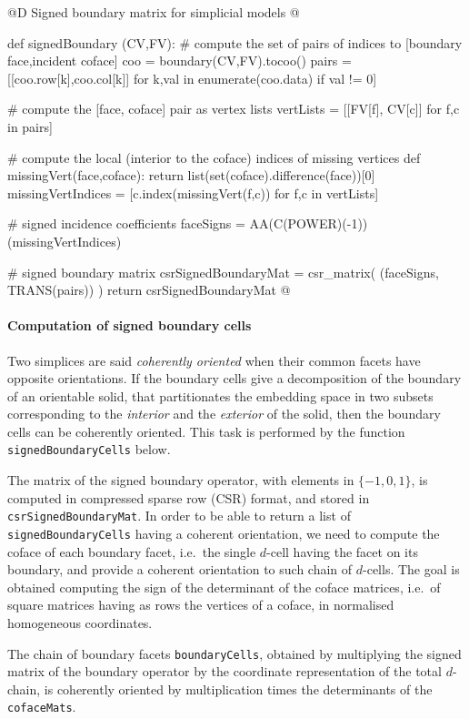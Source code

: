 \documentclass[11pt,oneside]{article}	%
\begin{document}
@D Signed boundary matrix for simplicial models
@{def signedBoundary (CV,FV):
	# compute the set of pairs of indices to [boundary face,incident coface]
	coo = boundary(CV,FV).tocoo()
	pairs = [[coo.row[k],coo.col[k]] for k,val in enumerate(coo.data) if val != 0]

	# compute the [face, coface] pair as vertex lists
	vertLists = [[FV[f], CV[c]] for f,c in pairs]

	# compute the local (interior to the coface) indices of missing vertices 
	def missingVert(face,coface): return list(set(coface).difference(face))[0]
	missingVertIndices = [c.index(missingVert(f,c)) for f,c in vertLists]

	# signed incidence coefficients
	faceSigns = AA(C(POWER)(-1))(missingVertIndices)

	# signed boundary matrix
	csrSignedBoundaryMat = csr_matrix( (faceSigns, TRANS(pairs)) )
	return csrSignedBoundaryMat
@}

\paragraph{Computation of signed boundary cells}

Two simplices are
said \emph{coherently oriented} when their common facets have opposite orientations.
If the boundary cells give a decomposition of the boundary of an orientable solid, that 
partitionates the embedding space in two subsets corresponding to the \emph{interior} and the \emph{exterior} 
of the solid, then the boundary cells can be coherently oriented. This task is performed by the function 
\texttt{signedBoundaryCells} below.

The matrix of the signed boundary operator, with elements in $\{-1,0,1\}$, is computed in 
compressed sparse row (CSR) format, and stored in \texttt{csrSignedBoundaryMat}. 
In order to be able to return a list of \texttt{signedBoundaryCells} having a coherent orientation,
we need to compute the coface of each boundary facet, i.e.~the single $d$-cell having the facet on its boundary,
and provide a coherent orientation to such chain of $d$-cells. 
The goal is obtained computing the sign of the determinant of the coface matrices, i.e.~of square matrices having 
as rows the vertices of a coface, in normalised homogeneous coordinates.

The chain of boundary facets \texttt{boundaryCells}, obtained by multiplying the signed matrix of the 
boundary operator by the coordinate representation of the total $d$-chain, is coherently oriented by multiplication 
times the determinants of the \texttt{cofaceMats}.
\end{document}
